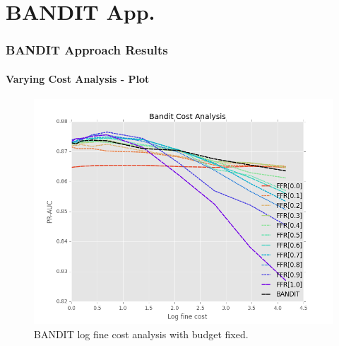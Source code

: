 \documentclass{beamer}
\begin{document}
\section{BANDIT App.}
\begin{frame}
    \frametitle{BANDIT Approach Results}
    \framesubtitle{Varying Cost Analysis - Plot}
    \begin{figure}[!htb]
        \centering
        \includegraphics[width=0.70\columnwidth]{fig/BanditPlotLogFine}
        \caption{BANDIT log fine cost analysis with budget fixed.}
        \label{fig:BanditPlotLogFine}
    \end{figure}
\end{frame}
\end{document}

